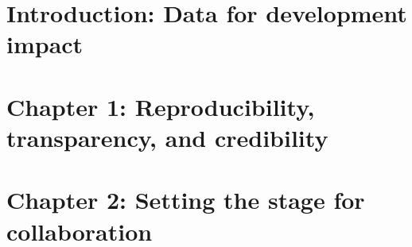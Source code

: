 %
%
%
%




\cleardoublepage
\chapter{Introduction: Data for development impact} %





\chapter{Chapter 1: Reproducibility, transparency, and credibility}
\label{ch:1}




\chapter{Chapter 2: Setting the stage for collaboration}
\label{ch:2}





